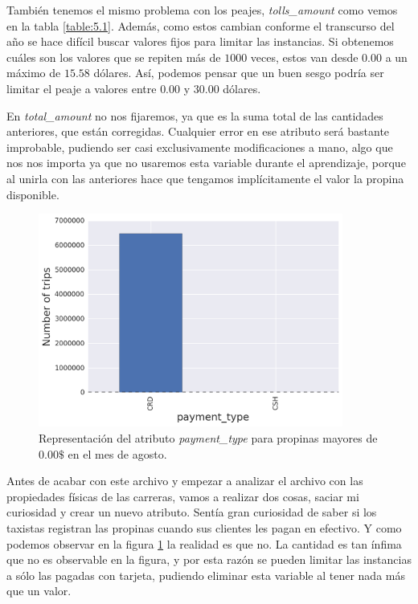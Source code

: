 También tenemos el mismo problema con los peajes, \emph{tolls\_amount} como vemos en la tabla \ref{table:5.1}. Además, como estos cambian conforme el transcurso del año se hace difícil buscar valores fijos para limitar las instancias. Si obtenemos cuáles son los valores que se repiten más de $1000$ veces, estos van desde $0.00$ a un máximo de $15.58$ dólares. Así, podemos pensar que un buen sesgo podría ser limitar el peaje a valores entre $0.00$ y $30.00$ dólares.

En \emph{total\_amount} no nos fijaremos, ya que es la suma total de las cantidades anteriores, que están corregidas. Cualquier error en ese atributo será bastante improbable, pudiendo ser casi exclusivamente modificaciones a mano, algo que nos nos importa ya que no usaremos esta variable durante el aprendizaje, porque al unirla con las anteriores hace que tengamos implícitamente el valor la propina disponible.

\begin{figure}[ht]
  \centering
  \includegraphics[width=100mm]{figures/ch_05/payment_type_2.png}
  \caption{Representación del atributo \emph{payment\_type} para propinas mayores de $0.00\$$ en el mes de agosto.}
  \label{fig:5.6}
\end{figure}

Antes de acabar con este archivo y empezar a analizar el archivo con las propiedades físicas de las carreras, vamos a realizar dos cosas, saciar mi curiosidad y crear un nuevo atributo. Sentía gran curiosidad de saber si los taxistas registran las propinas cuando sus clientes les pagan en efectivo. Y como podemos observar en la figura \ref{fig:5.6} la realidad es que no. La cantidad es tan ínfima que no es observable en la figura, y por esta razón se pueden limitar las instancias a sólo las pagadas con tarjeta, pudiendo eliminar esta variable al tener nada más que un valor.

